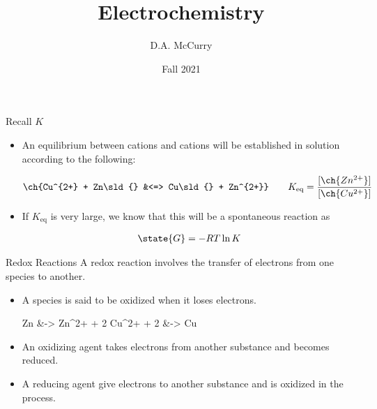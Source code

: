 \documentclass[notes=show]{beamer}
\title{Electrochemistry}
\institute{CHEM321 --- Analytical Chemistry I \\ Bloomsburg University}
\author{D.A. McCurry}
\date{Fall 2021}
\begin{document}
\maketitle
{}


\begin{frame}{Recall $K$}
	\begin{itemize}
		\item An equilibrium between  cations and
			 cations will be established in solution
			according to the following:

			\begin{align*}
				\ch{Cu^{2+} + Zn\sld{} &<=> Cu\sld{} + Zn^{2+}}
				\qquad K_{\text{eq}} =
				\frac{[\ch{Zn^{2+}}]}{[\ch{Cu^{2+}}]}
			\end{align*}
		
		\item If $K_\text{eq}$ is very large, we know that this will be
			a spontaneous reaction as

			\begin{align*}
				\state{G} = -RT \ln K
			\end{align*}
	\end{itemize}
\end{frame}

\begin{frame}{Redox Reactions}
	A \alert{redox reaction} involves the transfer of electrons from one
	species to another.
\begin{itemize}
		\item A species is said to be \alert{oxidized} when it
			\alert{loses} electrons.
			\begin{reactions*}
				Zn\sld{} &-> Zn^{2+} + 2 \el
				Cu^{2+} + 2 \el{} &-> Cu\sld
			\end{reactions*}
		\item An \alert{oxidizing agent} takes electrons from another
			substance and becomes \alert{reduced}.
		\item A \alert{reducing agent} give electrons to another
			substance and is \alert{oxidized} in the process.
	\end{itemize}
\end{frame}
\end{document}
